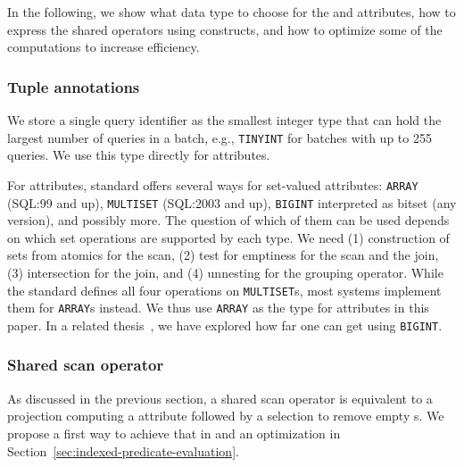 
In the following, we show what data type to choose for the \qid and \qset
attributes, how to express the shared operators using \sql constructs, and how
to optimize some of the computations to increase efficiency.

\subsubsection{Tuple annotations}

We store a single query identifier as the smallest integer type
that can hold the largest number of queries in a batch,
e.g., \lstinline[style=sql]{TINYINT} for batches with up to 255 queries.
We use this type directly for \qid attributes.

For \qset attributes, standard \sql offers several ways for set-valued
attributes: \lstinline[style=sql]{ARRAY} (SQL:99 and up),
\lstinline[style=sql]{MULTISET} (SQL:2003 and up), \lstinline[style=sql]{BIGINT}
interpreted as bitset (any version), and possibly more.  The question of which
of them can be used depends on which set operations are supported by each type.
We need (1) construction of sets from atomics for the scan, (2) test for
emptiness for the scan and the join, (3) intersection for the join, and (4)
unnesting for the grouping operator.  While the standard defines all four
operations on \lstinline[style=sql]{MULTISET}s, most systems implement them for
\lstinline[style=sql]{ARRAY}s instead.  We thus use \lstinline[style=sql]{ARRAY}
as the type for \qset attributes in this paper.  In a related
thesis~\cite{Wolf2017}, we have explored how far one can get using
\lstinline[style=sql]{BIGINT}.

\subsubsection{Shared scan operator}
\label{sec:shared_scan}

As discussed in the previous section,
a shared scan operator is equivalent
to a projection computing a \qset attribute
followed by a selection to remove empty \qset{}s.
We propose a first way to achieve that in \sql
and an optimization in Section~\ref{sec:indexed-predicate-evaluation}.

